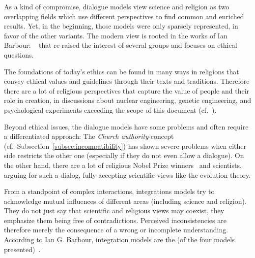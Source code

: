 \label{fig:dialogue}

As a kind of compromise, dialogue models view science and religion as two overlapping fields which use different perspectives to find common and enriched results.
Yet, in the beginning, those models were only sparsely represented, in favor of the other variants.
The modern view is rooted in the works of Ian Barbour: ~\cite{barbour1976myths} that re-raised the interest of several groups and focuses on ethical questions.

The foundations of today's ethics can be found in many ways in religions that convey ethical values and guidelines through their texts and traditions.
Therefore there are a lot of religious perspectives that capture the value of people and their role in creation, in discussions about nuclear engineering, genetic engineering, and psychological experiments exceeding the scope of this document (cf.~\cite{barbour1993ethics,reiss2001improving}).

Beyond ethical issues, the dialogue models have some problems and often require a differentiated approach:
The \emph{Church authority}-concept (cf.~Subsection~\ref{subsec:incompatibility}) has shown severe problems when either side restricts the other one (especially if they do not even allow a dialogue).
On the other hand, there are a lot of religious Nobel Prize winners~\cite{shalev2002100} and scientists, arguing for such a dialog, fully accepting scientific views like the evolution theory.


\label{subsec:integration}

From a standpoint of complex interactions, integrations models try to acknowledge mutual influences of different areas (including science and religion).
They do not just say that scientific and religious views may coexist, they emphasize them being free of contradictions.
Perceived inconsistencies are therefore merely the consequence of a wrong or incomplete understanding.
According to Ian G. Barbour, integration models are the  (of the four models presented)~\cite[p.~2]{Barbour2002}.


